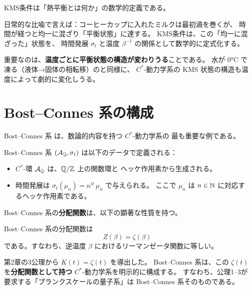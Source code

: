 \begin{hsbox}
KMS条件は「熱平衡とは何か」の数学的定義である。

日常的な比喩で言えば：コーヒーカップに入れたミルクは最初渦を巻くが、
時間が経つと均一に混ざり「平衡状態」に達する。
KMS条件は、この「均一に混ざった」状態を、
時間発展 $\sigma_t$ と温度 $\beta^{-1}$ の関係として数学的に定式化する。

重要なのは、\textbf{温度ごとに平衡状態の構造が変わりうる}ことである。
水が $0°$C で凍る（液体→固体の相転移）のと同様に、
$C^*$-動力学系の KMS 状態の構造も温度によって劇的に変化しうる。
\end{hsbox}


\section{Bost--Connes 系の構成}
\label{sec:bc-construction}

Bost--Connes 系 \cite{BostConnes1995} は、数論的内容を持つ $C^*$-動力学系の
最も重要な例である。

\begin{definition}
\label{def:BC-system}
Bost--Connes 系 $(\mathcal{A}_{\mathbb{Q}}, \sigma_t)$ は以下のデータで定義される：
\begin{itemize}
  \item $C^*$-環 $\mathcal{A}_{\mathbb{Q}}$ は、$\mathbb{Q}/\mathbb{Z}$ 上の関数環と
        ヘッケ作用素から生成される。
  \item 時間発展は $\sigma_t(\mu_n) = n^{it}\, \mu_n$ で与えられる。
        ここで $\mu_n$ は $n \in \mathbb{N}$ に対応するヘッケ作用素である。
\end{itemize}
\end{definition}

Bost--Connes 系の\textbf{分配関数}は、以下の顕著な性質を持つ。

\begin{theorem}
\label{thm:BC-partition}
Bost--Connes 系の分配関数は
\begin{equation}
  Z(\beta) = \zeta(\beta)
  \label{eq:BC-partition}
\end{equation}
である。すなわち、逆温度 $\beta$ におけるリーマンゼータ関数に等しい。
\end{theorem}

\begin{keyresult}
第2章の3公理から $K(t) = \zeta(t)$ を導出した。
Bost--Connes 系は、この $\zeta(t)$ を\textbf{分配関数として持つ}
$C^*$-動力学系を明示的に構成する。
すなわち、公理1--3が要求する「プランクスケールの量子系」は
Bost--Connes 系そのものである。
\end{keyresult}


